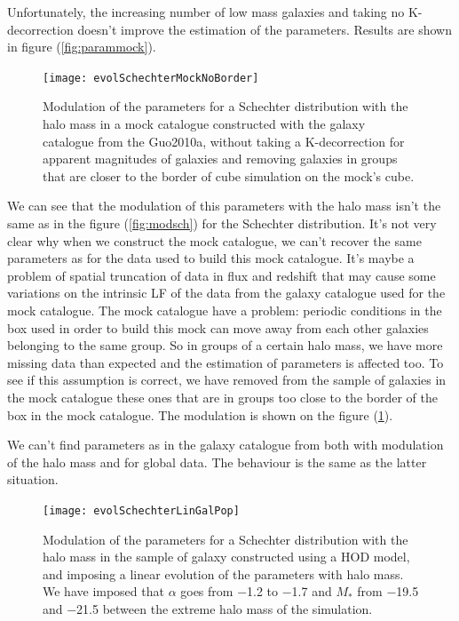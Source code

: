 Unfortunately, the increasing number of low mass galaxies and taking no K-decorrection doesn't improve the estimation of the
parameters. Results are shown in figure (\ref{fig:parammock}).
\begin{figure}[htb]
	\centering
	\texttt{[image: evolSchechterMockNoBorder]}
	\caption{\footnotesize{}Modulation of the parameters for a Schechter distribution with the halo mass in a mock catalogue
	constructed with the galaxy catalogue from the Guo2010a, without taking a K-decorrection for apparent magnitudes of
	galaxies and removing galaxies in groups that are closer to the border of cube simulation on the mock's cube.}
	\label{fig:parammocknoborder}
\end{figure}

We can see that the modulation of this parameters with the halo mass isn't the same as in the figure (\ref{fig:modsch}) for the
Schechter distribution. It's not very clear why when we construct the mock catalogue, we can't recover the same parameters as for
the data used to build this mock catalogue. It's maybe a problem of spatial truncation of data in flux and redshift that may cause
some variations on the intrinsic LF of the data from the galaxy catalogue used for the mock catalogue. The mock catalogue have a
problem: periodic conditions in the box used in order to build this mock can move away from each other galaxies belonging to the
same group. So in groups of a certain halo mass, we have more missing data than expected and the estimation of parameters is
affected too. To see if this assumption is correct, we have removed from the sample of galaxies in the mock catalogue these ones
that are in groups too close to the border of the box in the mock catalogue. The modulation is shown on the figure
(\ref{fig:parammocknoborder}).

We can't find parameters as in the galaxy catalogue from \citet{Guo+11} both with modulation of the halo mass and for global data.
The behaviour is the same as the latter situation.
\begin{figure}[htb]
	\centering
	\texttt{[image: evolSchechterLinGalPop]}
	\caption{\footnotesize{}Modulation of the parameters for a Schechter distribution with the halo mass in the sample of galaxy
	constructed using a HOD model, and imposing a linear evolution of the parameters with halo mass. We have imposed that
	$\alpha$ goes from \num{-1.2} to \num{-1.7} and $M_*$ from \num{-19.5} and \num{-21.5} between the extreme halo mass of the
	simulation.}
	\label{fig:paramschlin}
\end{figure}

